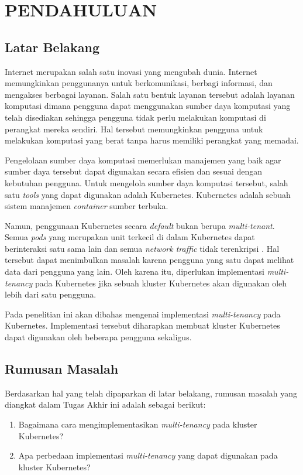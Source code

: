 \chapter{PENDAHULUAN}

\section{Latar Belakang}

Internet merupakan salah satu inovasi yang mengubah dunia. Internet
memungkinkan penggunanya untuk berkomunikasi, berbagi informasi, dan
mengakses berbagai layanan. Salah satu bentuk layanan tersebut adalah
layanan komputasi dimana pengguna dapat menggunakan sumber daya komputasi
yang telah disediakan sehingga pengguna tidak perlu melakukan komputasi
di perangkat mereka sendiri. Hal tersebut memungkinkan pengguna untuk
melakukan komputasi yang berat tanpa harus memiliki perangkat yang
memadai.

Pengelolaan sumber daya komputasi memerlukan manajemen yang
baik agar sumber daya tersebut dapat digunakan secara efisien dan sesuai
dengan kebutuhan pengguna. Untuk mengelola sumber daya komputasi tersebut,
salah satu \emph{tools} yang dapat digunakan adalah Kubernetes. Kubernetes
adalah sebuah sistem manajemen \emph{container} sumber terbuka.

Namun, penggunaan Kubernetes secara \emph{default} bukan berupa \emph{multi-tenant}.
Semua \emph{pods} yang merupakan unit terkecil di dalam Kubernetes dapat berinteraksi
satu sama lain dan semua \emph{network traffic} tidak terenkripsi \parencite{kubernetes-website-multi-tenancy}.
Hal tersebut dapat menimbulkan masalah karena pengguna yang satu dapat
melihat data dari pengguna yang lain. Oleh karena itu, diperlukan
implementasi \emph{multi-tenancy} pada Kubernetes jika sebuah kluster Kubernetes
akan digunakan oleh lebih dari satu pengguna.

Pada penelitian ini akan dibahas mengenai implementasi \emph{multi-tenancy}
pada Kubernetes. Implementasi tersebut diharapkan membuat kluster
Kubernetes dapat digunakan oleh beberapa pengguna sekaligus.

\section{Rumusan Masalah}

Berdasarkan hal yang telah dipaparkan di latar belakang, rumusan masalah
yang diangkat dalam Tugas Akhir ini adalah sebagai berikut:
\begin{enumerate}
  \vspace{-0.3cm}\item{Bagaimana cara mengimplementasikan \emph{multi-tenancy} pada kluster Kubernetes?}
  \vspace{-0.3cm}\item{Apa perbedaan implementasi \emph{multi-tenancy} yang dapat digunakan pada kluster Kubernetes?}
\end{enumerate}

